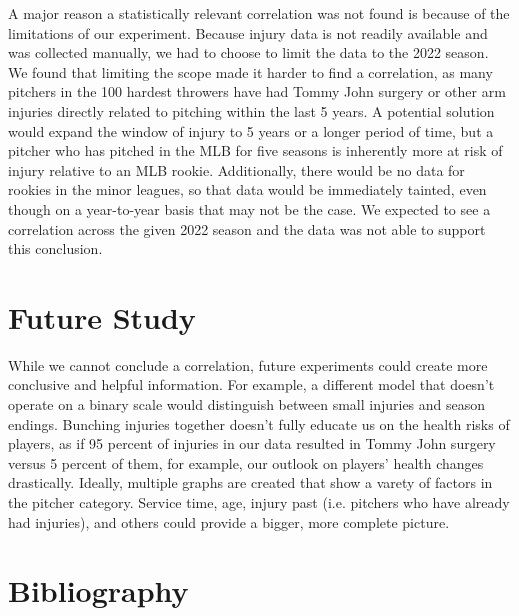 \documentclass{article}
\begin{document}
A major reason a statistically relevant correlation was not found is because of the limitations of our experiment. Because injury data is not readily available and was collected manually, we had to choose to limit the data to the 2022 season. We found that limiting the scope made it harder to find a correlation, as many pitchers in the 100 hardest throwers have had Tommy John surgery or other arm injuries directly related to pitching within the last 5 years. A potential solution would expand the window of injury to 5 years or a longer period of time, but a pitcher who has pitched in the MLB for five seasons is inherently more at risk of injury relative to an MLB rookie. Additionally, there would be no data for rookies in the minor leagues, so that data would be immediately tainted, even though on a year-to-year basis that may not be the case. We expected to see a correlation across the given 2022 season and the data was not able to support this conclusion.

\raggedbottom 
\section{Future Study}

While we cannot conclude a correlation, future experiments could create more conclusive and helpful information. For example, a different model that doesn't operate on a binary scale would distinguish between small injuries and season endings. Bunching injuries together doesn't fully educate us on the health risks of players, as if 95 percent of injuries in our data resulted in Tommy John surgery versus 5 percent of them, for example, our outlook on players' health changes drastically. Ideally, multiple graphs are created that show a varety of factors in the pitcher category. Service time, age, injury past (i.e. pitchers who have already had injuries), and others could provide a bigger, more complete picture. 

\section{Bibliography}


\end{document}
